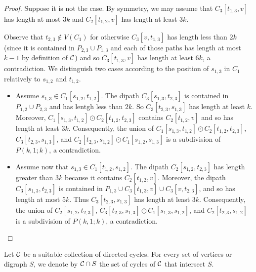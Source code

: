 \documentclass[utf8,10pt]{article}
\theoremstyle{plain}
\theoremstyle{definition}
\theoremstyle{remark}
\begin{document}
\begin{proof}
Suppose it is not the case. By symmetry, we may assume that $C_3[t_{1,3},v]$ has length at most $3k$ and
$C_2[t_{1,2},v]$ has length at least $3k$.

Observe that $t_{2,3}\notin V(C_1)$ for otherwise $C_3[v,t_{1,3}]$ has length less than $2k$ (since it is contained in $P_{2,3}\cup P_{1,3}$ and each of those paths has length at most $k-1$ by definition of ${\cal C}$) and so $C_3[t_{1,3},v]$ has length at least $6k$, a contradiction.
We distinguish two cases according to the position of $s_{1,3}$ in $C_1$ relatively to $s_{1,2}$ and $t_{1,2}$.

\begin{itemize}
	\item Assume $s_{1,3}\in C_1[s_{1,2},t_{1,2}]$. The dipath  $C_3[s_{1,3},t_{2,3}]$ is contained in $P_{1,2}\cup P_{2,3}$ and has lentgh less than $2k$. So $C_3[t_{2,3}, s_{1,3}]$ has length at least $k$. Moreover, $C_1[s_{1,3}, t_{1,2}]\odot C_2[t_{1,2}, t_{2,3}]$ contains $C_2[t_{1,2}, v]$  and so has length at least $3k$. Consequently, the union of $C_1[s_{1,3}, t_{1,2}]\odot C_2[t_{1,2}, t_{2,3}]$, $C_3[t_{2,3}, s_{1,3}]$, and
$C_2[t_{2,3}, s_{1,2}]\odot C_1[s_{1,2}, s_{1,3}]$ is a subdivision of $P(k,1;k)$, a contradiction.

	\item Assume now that $s_{1,3}\in C_1[t_{1,2},s_{1,2}]$. The dipath  $C_2[s_{1,2}, t_{2,3}]$ has length greater than $3k$ because it contains $C_2[t_{1,2},v]$. Moreover, the dipath $C_3[s_{1,3}, t_{2,3}]$ is contained in $P_{1,3}\cup C_3[t_{1,3},v]\cup C_3[v,t_{2,3}]$, and so has length at most $5k$.
	Thus $C_3[t_{2,3}, s_{1,3}]$ has length at least $3k$.
	 Consequently, the union of $C_2[s_{1,2}, t_{2,3}]$, $C_3[t_{2,3}, s_{1,3}]\odot C_1[s_{1,3}, s_{1,2}]$, and $C_2[t_{2,3}, s_{1,2}]$ is a subdivision of $P(k,1;k)$, a contradiction.
\end{itemize}
\end{proof}
 
 
 
 
 
 

Let ${\cal C}$ be a suitable collection of directed cycles.
For every set of vertices or digraph $S$, we denote by ${\cal C}\cap S$ the set of cycles of ${\cal C}$ that intersect $S$. 
\end{document}
